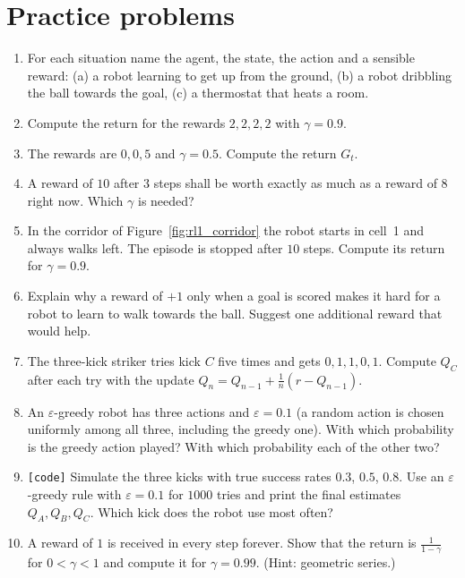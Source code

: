 \section*{Practice problems}
\begin{enumerate}[label=\textbf{\thechapter.\arabic*}]
  \item For each situation name the agent, the state, the action and a sensible reward: (a) a robot learning to get up from the ground, (b) a robot dribbling the ball towards the goal, (c) a thermostat that heats a room.
  \item Compute the return for the rewards $2,2,2,2$ with $\gamma=0.9$.
  \item The rewards are $0,0,5$ and $\gamma=0.5$. Compute the return $G_t$.
  \item A reward of $10$ after $3$ steps shall be worth exactly as much as a reward of $8$ right now. Which $\gamma$ is needed?
  \item In the corridor of Figure~\ref{fig:rl1_corridor} the robot starts in cell~1 and always walks left. The episode is stopped after $10$ steps. Compute its return for $\gamma=0.9$.
  \item Explain why a reward of $+1$ only when a goal is scored makes it hard for a robot to learn to walk towards the ball. Suggest one additional reward that would help.
  \item The three-kick striker tries kick $C$ five times and gets $0,1,1,0,1$. Compute $Q_C$ after each try with the update $Q_n=Q_{n-1}+\frac1n(r-Q_{n-1})$.
  \item An $\varepsilon$-greedy robot has three actions and $\varepsilon=0.1$ (a random action is chosen uniformly among all three, including the greedy one). With which probability is the greedy action played? With which probability each of the other two?
  \item \texttt{[code]} Simulate the three kicks with true success rates $0.3$, $0.5$, $0.8$. Use an $\varepsilon$-greedy rule with $\varepsilon=0.1$ for $1000$ tries and print the final estimates $Q_A,Q_B,Q_C$. Which kick does the robot use most often?
  \item[\textbf{\thechapter.10}$\star$] A reward of $1$ is received in every step forever. Show that the return is $\frac{1}{1-\gamma}$ for $0<\gamma<1$ and compute it for $\gamma=0.99$. (Hint: geometric series.)
\end{enumerate}
